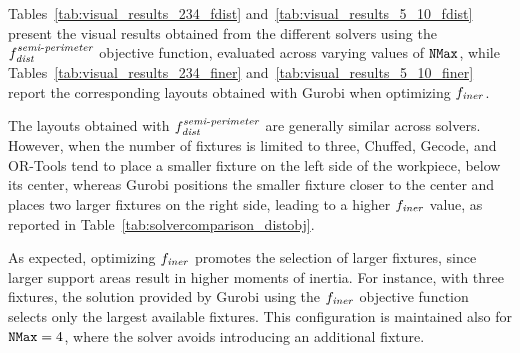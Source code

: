 Tables~\ref{tab:visual_results_234_fdist} and~\ref{tab:visual_results_5_10_fdist} present the visual results obtained from the different solvers using the $f_{\mathit{dist}}^{\mathit{semi\text{-}perimeter}}$ objective function, evaluated across varying values of $\mathtt{NMax}$, while Tables~\ref{tab:visual_results_234_finer} and~\ref{tab:visual_results_5_10_finer} report the corresponding layouts obtained with Gurobi when optimizing $f_\mathit{iner}$.

The layouts obtained with $f_{\mathit{dist}}^{\mathit{semi\text{-}perimeter}}$ are generally similar across solvers. However, when the number of fixtures is limited to three, Chuffed, Gecode, and OR-Tools tend to place a smaller fixture on the left side of the workpiece, below its center, whereas Gurobi positions the smaller fixture closer to the center and places two larger fixtures on the right side, leading to a higher $f_\mathit{iner}$ value, as reported in Table~\ref{tab:solvercomparison_distobj}.

As expected, optimizing $f_\mathit{iner}$ promotes the selection of larger fixtures, since larger support areas result in higher moments of inertia. For instance, with three fixtures, the solution provided by Gurobi using the $f_\mathit{iner}$ objective function selects only the largest available fixtures. This configuration is maintained also for $\mathtt{NMax}=4$, where the solver avoids introducing an additional fixture.


